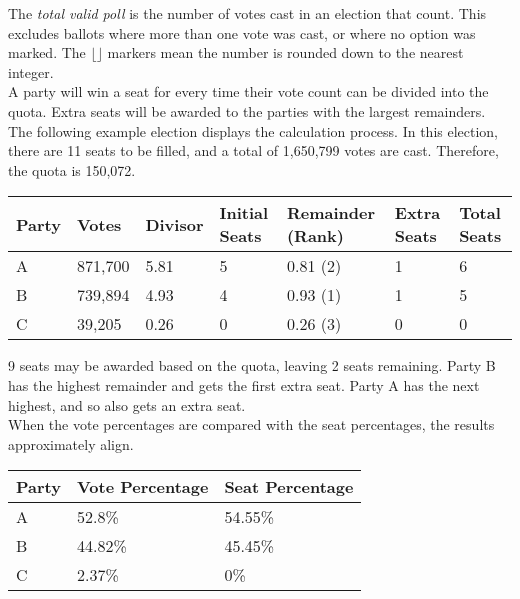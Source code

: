 \documentclass{article}
\begin{document}
    The \textit{total valid poll} is the number of votes cast in an election that count. This excludes ballots where more than one vote was cast, or where no option was marked. The $\lfloor \rfloor$ markers mean the number is rounded down to the nearest integer.\\

    A party will win a seat for every time their vote count can be divided into the quota. Extra seats will be awarded to the parties with the largest remainders. The following example election displays the calculation process. In this election, there are 11 seats to be filled, and a total of 1,650,799 votes are cast. Therefore, the quota is 150,072.\\

    \begin{adjustbox}{center}
    \begin{tabular}{ |l|l|l|l|l|l|l| }
        \hline
        Party & Votes & Divisor & Initial Seats & Remainder (Rank) & Extra Seats & Total Seats \\
        \hline
        A & 871,700 & 5.81 & 5 & 0.81 (2) & 1 & 6 \\
        \hline
        B & 739,894 & 4.93 & 4 & 0.93 (1) & 1 & 5 \\
        \hline
        C & 39,205 & 0.26 & 0 & 0.26 (3) & 0 & 0 \\
        \hline
    \end{tabular}
    \end{adjustbox}
    
    9 seats may be awarded based on the quota, leaving 2 seats remaining. Party B has the highest remainder and gets the first extra seat. Party A has the next highest, and so also gets an extra seat. \\

    When the vote percentages are compared with the seat percentages, the results approximately align.\\
    
    \begin{adjustbox}{center}
    \begin{tabular}{ |l|l|l| }
        \hline
        Party & Vote Percentage & Seat Percentage \\
        \hline
        A & 52.8\% & 54.55\% \\
        \hline
        B & 44.82\% & 45.45\% \\
        \hline
        C & 2.37\% & 0\% \\
        \hline
    \end{tabular}
    \end{adjustbox}
\end{document}
